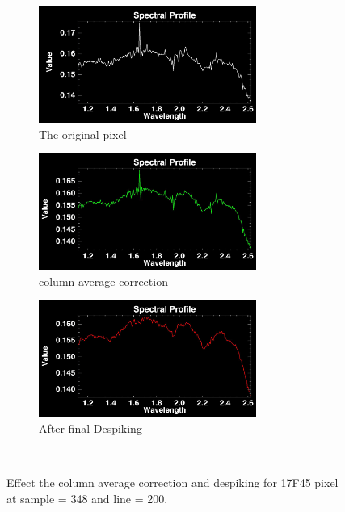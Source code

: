 \documentclass[pdftex, 12pt,a4paper,oneside]{report}
\begin{document}
\begin{figure}[!ht]
        \centering
        \begin{subfigure}[b]{0.2\textwidth}
                \centering
                \includegraphics[width=\textwidth, height=1.5in]{orig17F45_349_200.jpg}
                \caption{The original pixel}
                \label{fig:origPix_1}
        \end{subfigure}
        \qquad
        \quad
		\begin{subfigure}[b]{0.2\textwidth}
                \centering
                \includegraphics[width=\textwidth, height=1.5in]{avgCorr17F45_349_200.jpg}
                \caption{column average correction}
                \label{fig:avgCorr_1}
        \end{subfigure}   
        \qquad    
        \quad
        \begin{subfigure}[b]{0.2\textwidth}
                \centering
                \includegraphics[width=\textwidth, height=1.5in]{dspkavgCorr17F45_349_200.jpg}
                \caption{After final Despiking}
                \label{fig:dspkCorr_1}
        \end{subfigure}%
        ~ 
        
        \caption{Effect the column average correction and despiking for 17F45 pixel at sample = 348 and line = 200.}
               
\end{figure} 
\end{document}

